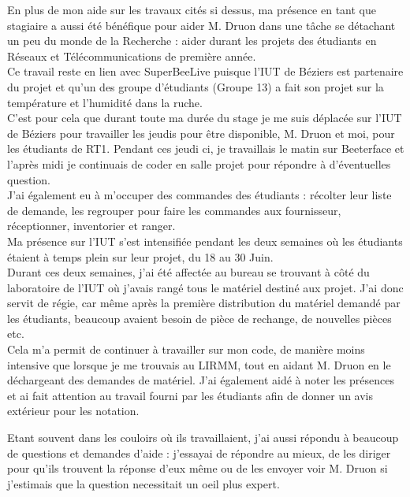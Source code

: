 \documentclass[11pt,french,a4paper]{report}
\begin{document}
En plus de mon aide sur les travaux cités si dessus, ma présence en tant que stagiaire a aussi été bénéfique pour aider M. Druon 
dans une tâche se détachant un peu du monde de la Recherche : aider durant les projets des étudiants en Réseaux et Télécommunications 
de première année. \\
Ce travail reste en lien avec SuperBeeLive puisque l'IUT de Béziers est partenaire du projet et qu'un des groupe d'étudiants (Groupe 13) 
a fait son projet sur la température et l'humidité dans la ruche. \\

C'est pour cela que durant toute ma durée du stage je me suis déplacée sur l'IUT de Béziers pour travailler les jeudis pour être
disponible, M. Druon et moi, pour les étudiants de RT1. Pendant ces jeudi ci, je travaillais le matin sur Beeterface et 
l'après midi je continuais de coder en salle projet pour répondre à d'éventuelles question. \\

J'ai également eu à m'occuper des commandes des étudiants : récolter leur liste de demande, les regrouper pour faire les commandes
aux fournisseur, réceptionner, inventorier et ranger. \\

Ma présence sur l'IUT s'est intensifiée pendant les deux semaines où les étudiants étaient à temps plein sur leur projet, du 18 au 30 Juin. \\

Durant ces deux semaines, j'ai été affectée au bureau se trouvant à côté du laboratoire de l'IUT où j'avais rangé tous le matériel 
destiné aux projet.
J'ai donc servit de régie, car même après la première distribution du matériel demandé par les étudiants, beaucoup avaient 
besoin de pièce de rechange, de nouvelles pièces etc. \\

Cela m'a permit de continuer à travailler sur mon code, de manière moins intensive que lorsque je me trouvais au LIRMM, tout en
aidant M. Druon en le déchargeant des demandes de matériel. 
J'ai également aidé à noter les présences et ai fait attention au travail fourni par les étudiants afin de donner un avis extérieur pour
les notation.

Etant souvent dans les couloirs où ils travaillaient, j'ai aussi répondu à beaucoup de questions et demandes d'aide : 
j'essayai de répondre au mieux, de les diriger pour qu'ils trouvent la réponse d'eux même ou de les envoyer voir M. Druon si 
j'estimais que la question necessitait un oeil plus expert. \\
\end{document}
